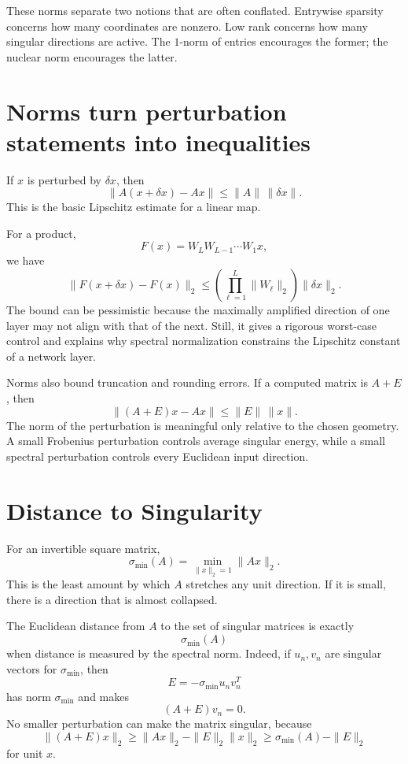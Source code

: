 These norms separate two notions that are often conflated.  Entrywise sparsity concerns how many coordinates are nonzero.  Low rank concerns how many singular directions are active.  The \(1\)-norm of entries encourages the former; the nuclear norm encourages the latter.

\section{Norms turn perturbation statements into inequalities}

If \(x\) is perturbed by \(\delta x\), then
\[
  \|A(x+\delta x)-Ax\|
  \le \|A\|\,\|\delta x\|.
\]
This is the basic Lipschitz estimate for a linear map.

For a product,
\[
  F(x)=W_LW_{L-1}\cdots W_1x,
\]
we have
\[
  \|F(x+\delta x)-F(x)\|_2
  \le
  \left(\prod_{\ell=1}^L\|W_\ell\|_2\right)
  \|\delta x\|_2.
\]
The bound can be pessimistic because the maximally amplified direction of one layer may not align with that of the next.  Still, it gives a rigorous worst-case control and explains why spectral normalization constrains the Lipschitz constant of a network layer.

Norms also bound truncation and rounding errors.  If a computed matrix is \(A+E\), then
\[
  \|(A+E)x-Ax\|
  \le \|E\|\,\|x\|.
\]
The norm of the perturbation is meaningful only relative to the chosen geometry.  A small Frobenius perturbation controls average singular energy, while a small spectral perturbation controls every Euclidean input direction.

\section{Distance to Singularity}

For an invertible square matrix,
\[
  \sigma_{\min}(A)
  =\min_{\|x\|_2=1}\|Ax\|_2.
\]
This is the least amount by which \(A\) stretches any unit direction.  If it is small, there is a direction that is almost collapsed.

The Euclidean distance from \(A\) to the set of singular matrices is exactly
\[
  \sigma_{\min}(A)
\]
when distance is measured by the spectral norm.  Indeed, if \(u_n,v_n\) are singular vectors for \(\sigma_{\min}\), then
\[
  E=-\sigma_{\min}u_nv_n^T
\]
has norm \(\sigma_{\min}\) and makes
\[
  (A+E)v_n=0.
\]
No smaller perturbation can make the matrix singular, because
\[
  \|(A+E)x\|_2
  \ge \|Ax\|_2-\|E\|_2\|x\|_2
  \ge \sigma_{\min}(A)-\|E\|_2
\]
for unit \(x\).

